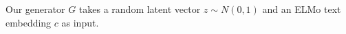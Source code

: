 Our generator $G$ takes a random latent vector $z \sim N(0, 1)$ and an ELMo text embedding $c$ as input. %